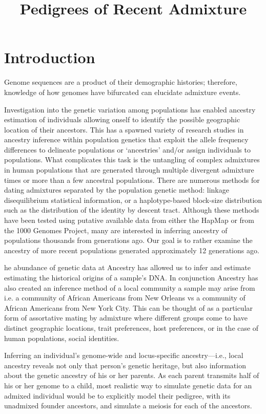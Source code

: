 \documentclass{article}
\begin{document}
\title{Pedigrees of Recent Admixture}
\maketitle

\section{Introduction}

Genome sequences are a product of their demographic histories; therefore, knowledge of how genomes have bifurcated can elucidate admixture events.

Investigation into the genetic variation among populations has enabled ancestry estimation of individuals allowing onself to identify the possible geographic location of their ancestors.  This has a spawned variety of research studies in ancestry inference within population genetics that exploit the allele frequency differences to delineate populations or ‘ancestries’ and/or assign individuals to populations.  What complicates this task is the untangling of complex admixtures in human populations that are generated through multiple divergent admixture times or more than a few ancestral populations.  There are numerous methods for dating admixtures separated by the population genetic method: linkage disequilibrium statistical information, or a haplotype-based block-size distribution such as the distribution of the identity by descent tract.  Although these methods have been tested using putative available data from either the HapMap or from the 1000 Genomes Project, many are interested in inferring ancestry of populations thousands from generations ago.  Our goal is to  rather examine the ancestry of more recent populations generated approximately 12 generations ago.  

he abundance of genetic data at Ancestry has allowed us to infer and estimate estimating the historical origins of a sample’s DNA.   In conjunction Ancestry has also created an inference method of a local community a sample may arise from i.e. a community of African Americans from New Orleans vs a community of African Americans from New York City.   This can be thought of as a particular form of assortative mating by admixture where different groups come to have distinct geographic locations, trait preferences, host preferences, or in the case of human populations, social identities.  

Inferring an individual’s genome-wide and locus-specific ancestry—i.e., local ancestry reveals not only that person’s genetic heritage, but also information about the genetic ancestry of his or her parents.   As each parent transmits half of his or her genome to a child,  most realistic way to simulate genetic data for an admixed individual would be to explicitly
model their pedigree, with its unadmixed founder ancestors, and simulate a meiosis for each of the ancestors.
\end{document}
